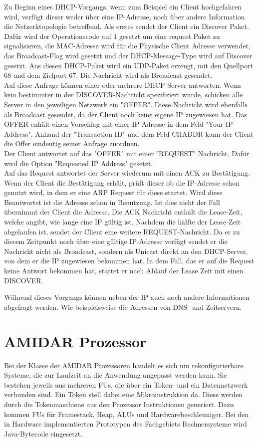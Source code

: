 Zu Beginn eines DHCP-Vorgangs, wenn zum Beispiel ein Client hochgefahren wird, verfügt dieser weder über eine IP-Adresse, noch über andere Information die Netzerktopologie betreffend. Als erstes sendet der Client ein Discover Paket. Dafür wird der Operationscode auf 1 gesetzt um eine request Paket zu signalisieren, die MAC-Adresse wird für die Physische Client Adresse verwendet, das Broadcast-Flag wird gesetzt und der DHCP-Message-Type wird auf Discover gesetzt. Aus diesen DHCP-Paket wird ein UDP-Paket erzeugt, mit den Quellport  68 und dem Zielport 67. Die Nachricht wird als Broadcast gesendet. \\
Auf diese Anfrage können einer oder mehrere DHCP Server antworten. Wenn kein bestimmter in der DISCOVER-Nachricht spezifiziert wurde, schicken alle Server in den jeweiligen Netzwerk ein "{}OFFER". Diese Nachricht wird ebenfalls als Broadcast gesendet, da der Client noch keine eigene IP zugewiesen hat. Das OFFER enhält einen Vorschlag mit einer IP Adresse in dem Feld "Your IP Address". Anhand der "Transaction ID"{} und dem Feld CHADDR kann der Client die Offer eindeutig seiner Anfrage zuordnen. \\
Der Client antwortet auf das "{}OFFER"{} mit einer "REQUEST"{} Nachricht. Dafür wird die Option "Requested IP Address"{} gesetzt. \\
Auf das Request antwortet der Server wiederum mit einen ACK zu Bestätigung. Wenn der Client die Bestätigung erhält, prüft dieser ob die IP-Adresse schon genutzt wird, in dem er eine ARP Request für diese startet. Wird diese Beantwortet ist die Adresse schon in Benutzung. Ist dies nicht der Fall übernimmt der Client die Adresse. 
Die ACK Nachricht enthält die Lease-Zeit, welche angibt, wie lange eine IP gültig ist. 
Nachdem die hälfte der Lease-Zeit abgelaufen ist, sendet der Client eine weitere REQUEST-Nachricht. Da er zu diesem Zeitpunkt noch über eine gültige IP-Adresse verfügt sendet er die Nachricht nicht als Broadcast, sondern als Unicast direkt an den DHCP-Server, von dem er die IP zugewiesen bekommen hat. In dem Fall, das er auf die Request keine Antwort bekommen hat, startet er nach Ablauf der Lease Zeit mit einen DISCOVER.


Während dieses Vorgangs können neben der IP auch noch andere Informationen abgefragt werden. Wie beispielsweise die Adressen von DNS- und Zeitservern.





\section{AMIDAR Prozessor}
Bei der Klasse der AMIDAR Prozessoren handelt es sich um rekonfigurierbare Systeme, die zur Laufzeit an die Anwendung angepasst werden kann. Sie bestehen jeweils aus mehreren FUs, die über ein Token- und ein Datennetzwerk verbunden sind. Ein Token stell dabei eine Mikroinstruktion da. Diese werden durch die Tokenmaschiene aus den Prozessor Instruktionen generiert. Dazu kommen FUs für Framestack, Heap, ALUs und Hardwarebeschleuniger. Bei den in Hardware implementierten Prototypen des Fachgebiets Rechnersysteme wird Java-Bytecode eingesetzt.
